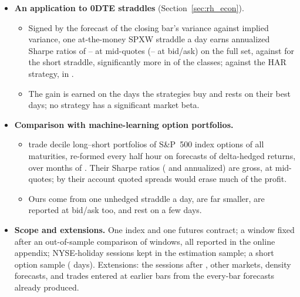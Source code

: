 \begin{itemize}
  a difference carried almost entirely by \rhcaTopDays{} days of the COVID-19 crash; without the crash window it is
  significantly lower in \rhcaNMseLowerSigBarOosExCrash{} classes.
\item \textbf{An application to 0DTE straddles} (Section~\ref{sec:rh_econ}).
  \begin{itemize}
  \item Signed by the forecast of the closing bar's variance against implied variance, one at-the-money SPXW
    straddle a day earns annualized Sharpe ratios of \rhrPoolShFullMin--\rhrPoolShFullMax{} at mid-quotes
    (\rhrPoolShXFullMin--\rhrPoolShXFullMax{} at bid/ask) on the full set, against \rheShortSh{} for the short
    straddle, significantly more in \rhemFullVsShortSig{} of the \rhorAfPairs{} classes; against the HAR strategy, in
    \rhemFullVsOlsHarSig{}.
  \item The gain is earned on the days the strategies buy and rests on their \rhedNTop{} best days; no strategy has a
    significant market beta.
  \end{itemize}
\item \textbf{Comparison with machine-learning option portfolios.}
  \begin{itemize}
  \item \citet{MaischZhangUlrichZimmer2026} trade decile long--short portfolios of S\&P~500 index options of all
    maturities, re-formed every half hour on forecasts of delta-hedged returns, over \extMaischTestMonths{} months of
    \extMaischYear. Their Sharpe ratios (\extMaischSrGbrtAnn{} and \extMaischSrEnsAnn{} annualized) are gross, at
    mid-quotes; by their account quoted spreads would erase much of the profit.
  \item Ours come from one unhedged straddle a day, are far smaller, are reported at bid/ask too, and rest on a few
    days.
  \end{itemize}
\item \textbf{Scope and extensions.} One index and one futures contract; a window fixed after an out-of-sample
  comparison of windows, all reported in the online appendix; NYSE-holiday sessions kept in the estimation sample; a
  short option sample (\rheSzDays{} days). Extensions: the sessions after \rhorSpanEnd, other markets, density
  forecasts, and trades entered at earlier bars from the every-bar forecasts already produced.
\end{itemize}

